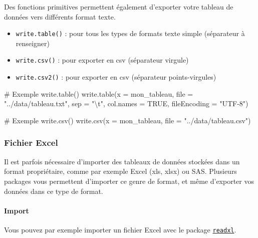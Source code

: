 \documentclass[
  letterpaper,
  DIV=11,
  numbers=noendperiod]{scrartcl}
\let\oldparagraph\paragraph
\renewcommand{\paragraph}[1]{\oldparagraph{#1}\mbox{}}
\newenvironment{Shaded}{\begin{snugshade}}{\end{snugshade}}
\newcommand{\AttributeTok}[1]{\textcolor[rgb]{0.40,0.45,0.13}{#1}}
\newcommand{\CommentTok}[1]{\textcolor[rgb]{0.37,0.37,0.37}{#1}}
\newcommand{\ConstantTok}[1]{\textcolor[rgb]{0.56,0.35,0.01}{#1}}
\newcommand{\FunctionTok}[1]{\textcolor[rgb]{0.28,0.35,0.67}{#1}}
\newcommand{\NormalTok}[1]{\textcolor[rgb]{0.00,0.23,0.31}{#1}}
\newcommand{\SpecialCharTok}[1]{\textcolor[rgb]{0.37,0.37,0.37}{#1}}
\newcommand{\StringTok}[1]{\textcolor[rgb]{0.13,0.47,0.30}{#1}}
\providecommand{\tightlist}{%
  \setlength{\itemsep}{0pt}\setlength{\parskip}{0pt}}\usepackage{longtable,booktabs,array}
\begin{document}
Des fonctions primitives permettent également d'exporter votre tableau
de données vers différents format texte.

\begin{itemize}
\tightlist
\item
  \texttt{write.table()} : pour tous les types de formats texte simple
  (séparateur à renseigner)
\item
  \texttt{write.csv()} : pour exporter en csv (séparateur virgule)
\item
  \texttt{write.csv2()} : pour exporter en csv (séparateur
  points-virgules)
\end{itemize}

\begin{Shaded}
\begin{Highlighting}[]
\CommentTok{\# Exemple write.table()}
\FunctionTok{write.table}\NormalTok{(}\AttributeTok{x =}\NormalTok{ mon\_tableau, }
            \AttributeTok{file =} \StringTok{"../data/tableau.txt"}\NormalTok{, }
            \AttributeTok{sep =} \StringTok{"}\SpecialCharTok{\textbackslash{}t}\StringTok{"}\NormalTok{, }\AttributeTok{col.names =} \ConstantTok{TRUE}\NormalTok{, }
            \AttributeTok{fileEncoding =} \StringTok{"UTF{-}8"}\NormalTok{)}
              
\CommentTok{\# Exemple write.csv()}
\FunctionTok{write.csv}\NormalTok{(}\AttributeTok{x =}\NormalTok{ mon\_tableau, }\AttributeTok{file =} \StringTok{"../data/tableau.csv"}\NormalTok{)}
\end{Highlighting}
\end{Shaded}

\hfill\break

\hypertarget{fichier-excel}{%
\subsubsection{Fichier Excel}\label{fichier-excel}}

Il est parfois nécessaire d'importer des tableaux de données stockées
dans un format propriétaire, comme par exemple Excel (xls, xlsx) ou SAS.
Plusieurs packages vous permettent d'importer ce genre de format, et
même d'exporter vos données dans ce type de format.

\hypertarget{import-1}{%
\paragraph{Import}\label{import-1}}

Vous pouvez par exemple importer un fichier Excel avec le package
\href{https://readxl.tidyverse.org/}{\texttt{readxl}}.
\end{document}
